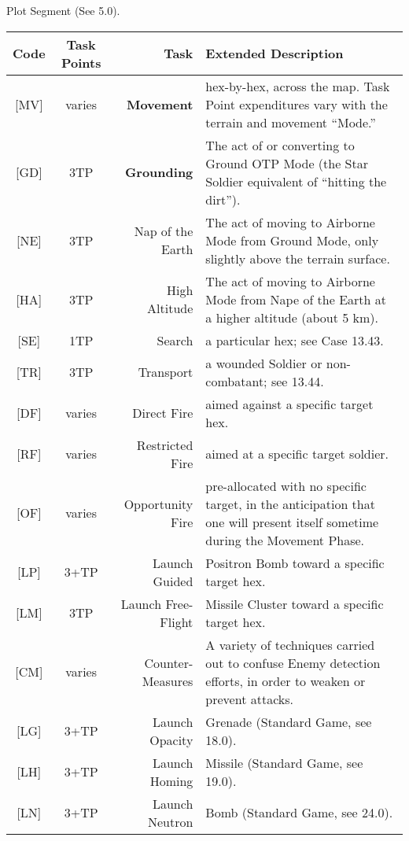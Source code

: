 \documentclass[10pt]{article}
\begin{document}
\begin{center}

Plot Segment (See 5.0).

\begin{tabular}{ccrp{9cm}}\hline
  Code & Task Points & Task & Extended Description\\\hline

  [MV] & varies &
  {\bf Movement} & hex-by-hex, across the
map. Task Point expenditures vary
with the terrain and movement
``Mode.''\\

[GD] &  3TP & {\bf Grounding } & The act of or
converting to Ground OTP Mode
(the Star Soldier equivalent of ``hitting the dirt'').\\

[NE] & 3TP &
Nap of the Earth & The act of
moving to Airborne Mode from
Ground Mode, only slightly above
the terrain surface.\\

[HA] & 3TP &
High Altitude & The act of moving
to Airborne Mode from Nape of the
Earth at a higher altitude (about 5 km).\\

[SE] & 1TP & Search & a particular hex; see Case
13.43.\\

[TR] & 3TP & Transport & a wounded Soldier or
non-combatant; see 13.44.\\\hline

[DF] & varies & Direct Fire & aimed
against a specific target hex.\\

[RF] & varies & Restricted Fire & aimed at a specific
target soldier.\\

[OF] & varies &
Opportunity Fire & pre-allocated
with no specific target, in the
anticipation that one will present
itself sometime during the
Movement Phase.\\\hline

[LP] & 3+TP & Launch Guided & Positron Bomb
toward a specific target hex.\\

[LM] & 3TP & Launch Free-Flight & Missile Cluster
toward a specific target hex.\\

[CM] & varies &
Counter-Measures & A variety of
techniques carried out to confuse
Enemy detection efforts, in order to
weaken or prevent attacks.\\

[LG] & 3+TP & Launch Opacity & Grenade (Standard
Game, see 18.0).\\

[LH] & 3+TP & Launch Homing & Missile
(Standard Game, see 19.0).\\

[LN] & 3+TP & Launch Neutron & Bomb
(Standard Game, see 24.0).\\\hline

\end{tabular}
\end{center}
\end{document}

